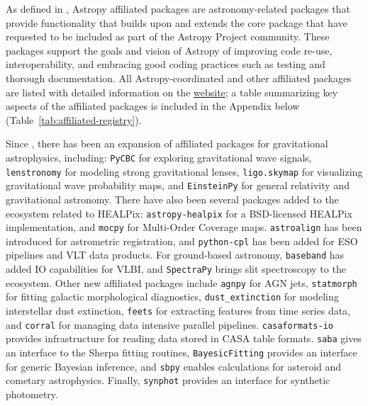 \documentclass[modern]{aastex631}
\begin{document}
As defined in \paperii, Astropy affiliated packages are astronomy-related
\python packages that provide functionality that builds upon and extends the
\astropypkg core package that have requested to be included as part of the
Astropy Project community. These packages support the goals and vision of
Astropy of improving code re-use, interoperability, and embracing good coding
practices such as testing and thorough documentation.
All Astropy-coordinated and other affiliated packages are listed with detailed
information on the \href{{https://www.astropy.org/affiliated}}{\astropy
website}; a table summarizing key aspects of the affiliated packages is included
in the Appendix below (Table~\ref{tab:affiliated-registry}).

Since \paperii, there has been an expansion of affiliated
packages for gravitational astrophysics, including:
\texttt{PyCBC} for exploring gravitational wave signals, \texttt{lenstronomy} for
modeling strong gravitational lenses, \texttt{ligo.skymap} for visualizing
gravitational wave probability maps, and \texttt{EinsteinPy} for general
relativity and gravitational astronomy. There have also been several packages
added to the ecosystem related to HEALPix: \texttt{astropy-healpix}
for a BSD-licensed HEALPix implementation, and \texttt{mocpy} for Multi-Order
Coverage maps. \texttt{astroalign} has been introduced for astrometric registration,
and \texttt{python-cpl} has been added for ESO pipelines and VLT data products.
For ground-based astronomy, \texttt{baseband} has added IO capabilities for
VLBI, and \texttt{SpectraPy} brings slit spectroscopy to the \astropy ecosystem.
Other new affiliated packages include \texttt{agnpy} for AGN jets,
\texttt{statmorph} for fitting galactic morphological diagnostics,
\texttt{dust\_extinction} for modeling interstellar dust extinction,
\texttt{feets} for extracting features from time series data, and
\texttt{corral} for managing data intensive parallel pipelines.
\texttt{casaformats-io} provides infrastructure for reading data stored in CASA table formats.
\texttt{saba} gives an interface to the Sherpa \citep{sherpa} fitting routines,
\texttt{BayesicFitting} provides an interface for generic Bayesian inference,
and \texttt{sbpy} enables calculations for asteroid and
cometary astrophysics. Finally, \texttt{synphot} provides an interface for
synthetic photometry.
\end{document}
